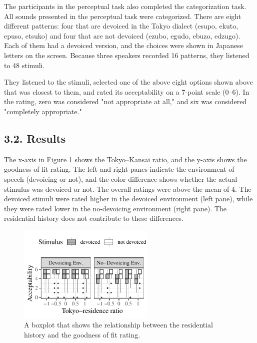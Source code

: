 \documentclass[a4paper,11pt,twocolumn]{article}
\begin{document}
The participants in the perceptual task also completed the categorization task. All sounds presented in the perceptual task were categorized. There are eight different patterns: four that are devoiced in the Tokyo dialect (esupo, ekuto, epuso, etsuko) and four that are not devoiced (ezubo, egudo, ebuzo, edzugo). Each of them had a devoiced version, and the choices were shown in Japanese letters on the screen. Because three speakers recorded 16 patterns, they listened to 48 stimuli.

They listened to the stimuli, selected one of the above eight options shown above that was closest to them, and rated its acceptability on a 7-point scale (0--6). In the rating, zero was considered "not appropriate at all," and six was considered "completely appropriate."

\subsection{3.2. Results}

The x-axis in Figure \ref{fig:cat_results} shows the Tokyo--Kansai ratio, and the y-axis shows the goodness of fit rating. The left and right panes indicate the environment of speech (devoicing or not), and the color difference shows whether the actual stimulus was devoiced or not. The overall ratings were above the mean of 4. The devoiced stimuli were rated higher in the devoiced environment (left pane), while they were rated lower in the no-devoicing environment (right pane). The residential history does not contribute to these differences.
\begin{figure}[!ht]
\begin{center}
\includegraphics[width=6.5cm]{../results/artifact/results_categorization.pdf}
\caption{A boxplot that shows the relationship between the residential history and the goodness of fit rating.}\label{fig:cat_results}
\end{center}
\end{figure}
\end{document}

